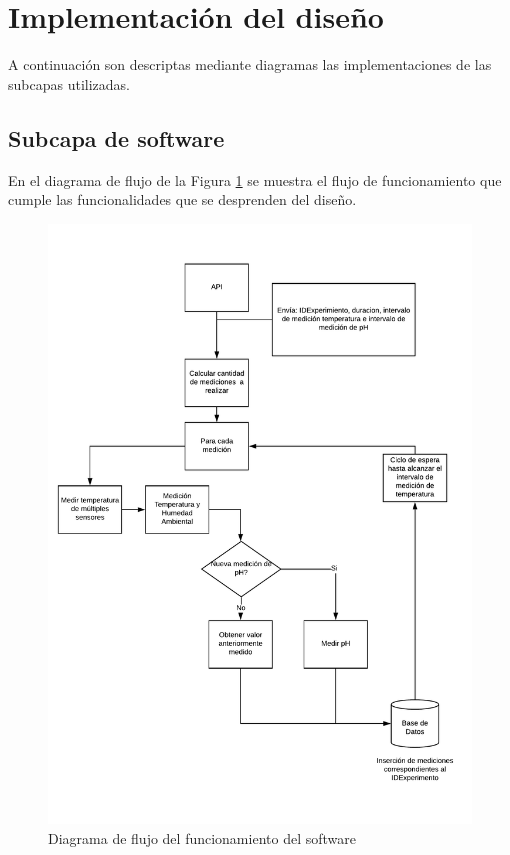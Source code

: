                 
                
                
        
    
\section{Implementación del diseño}
    \par A continuación son descriptas mediante diagramas las implementaciones de las subcapas utilizadas.
  
    \subsection{Subcapa de software}
        \par En el diagrama de flujo de la Figura \ref{FlujoPython} se muestra el flujo de funcionamiento que cumple las funcionalidades que se desprenden del diseño.

        \begin{figure}
        \centering
            \includegraphics[scale=0.75]{hardware/DiagramadeFlujoPython.pdf}
            \caption{Diagrama de flujo del funcionamiento del software }
            \label{FlujoPython}
        \end{figure}

